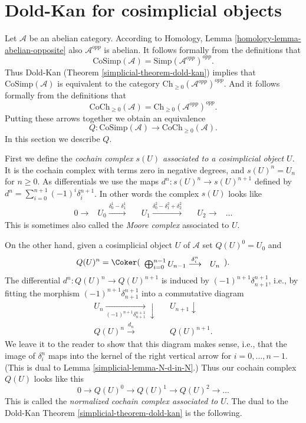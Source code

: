 \section{Dold-Kan for cosimplicial objects}
\label{simplicial-section-dold-kan-cosimplicial}
Let $\mathcal{A}$ be an abelian category.
According to Homology, Lemma \ref{homology-lemma-abelian-opposite}
also $\mathcal{A}^{opp}$ is abelian. It follows
formally from the definitions that
$$
\text{CoSimp}(\mathcal{A}) = \text{Simp}(\mathcal{A}^{opp})^{opp}.
$$
Thus Dold-Kan
(Theorem \ref{simplicial-theorem-dold-kan})
implies that $\text{CoSimp}(\mathcal{A})$ is equivalent to
the category
$\text{Ch}_{\geq 0}(\mathcal{A}^{opp})^{opp}$. And it
follows formally from the definitions that
$$
\text{CoCh}_{\geq 0}(\mathcal{A}) =
\text{Ch}_{\geq 0}(\mathcal{A}^{opp})^{opp}.
$$
Putting these arrows together we obtain an equivalence
$$
Q :
\text{CoSimp}(\mathcal{A})
\longrightarrow
\text{CoCh}_{\geq 0}(\mathcal{A}).
$$
In this section we describe $Q$.

\medskip\noindent
First we define the
{\it cochain complex $s(U)$ associated to a cosimplicial
object $U$}. It is the cochain complex with terms zero in
negative degrees, and $s(U)^n = U_n$ for $n \geq 0$.
As differentials we use the maps
$d^n : s(U)^n \to s(U)^{n + 1}$ defined by
$d^n = \sum_{i = 0}^{n + 1} (-1)^i \delta^{n + 1}_i$.
In other words the complex $s(U)$ looks like
$$
\begin{array}{ccccccc}0 \longrightarrow & U_0 \overset{\delta^1_0 - \delta^1_1}{\longrightarrow} &  & U_1 \overset{\delta^2_0 - \delta^2_1 + \delta^2_2}{\longrightarrow} &  & U_2 \longrightarrow & \ldots\end{array}
$$
This is sometimes also called the {\it Moore complex} associated
to $U$.

\medskip\noindent
On the other hand, given a
cosimplicial object $U$ of $\mathcal{A}$ set
$Q(U)^0 = U_0$ and
$$
Q(U)^n = \Coker(
\begin{array}{cc}\bigoplus_{i = 0}^{n - 1} U_{n - 1} \overset{\delta^n_i}{\longrightarrow} & U_n\end{array}).
$$
The differential $d^n : Q(U)^n \to Q(U)^{n + 1}$
is induced by $(-1)^{n + 1}\delta^{n + 1}_{n + 1}$, i.e., by
fitting the morphism
$(-1)^{n + 1}\delta^{n + 1}_{n + 1}$
into a commutative
diagram
$$
\begin{array}{ccc}U_n \underset{(-1)^{n + 1}\delta^{n + 1}_{n + 1}}{\longrightarrow}\downarrow &  & U_{n + 1} \downarrow \\ Q(U)^n \overset{d_n}{\longrightarrow} &  & Q(U)^{n + 1}.\end{array}
$$
We leave it to the reader to show that this diagram makes
sense, i.e., that the image of $\delta^n_i$ maps into
the kernel of the right vertical arrow for $i = 0, \ldots, n - 1$.
(This is dual to Lemma \ref{simplicial-lemma-N-d-in-N}.)
Thus our cochain complex $Q(U)$ looks like this
$$
0 \to Q(U)^0 \to Q(U)^1 \to Q(U)^2 \to \ldots
$$
This is called the {\it normalized cochain complex associated
to $U$}.
The dual to the Dold-Kan Theorem \ref{simplicial-theorem-dold-kan} is the following.

